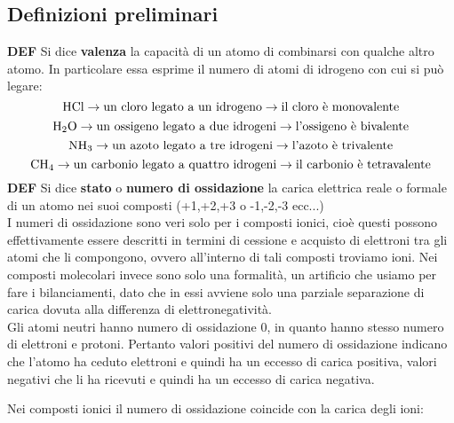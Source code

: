 \subsection{Definizioni preliminari}
\textbf{DEF} Si dice \textbf{valenza} la capacità di un atomo di combinarsi con qualche altro atomo. In particolare essa esprime il numero di atomi di idrogeno con cui si può legare:
$$\ce{HCl} \rightarrow \text{un cloro legato a un idrogeno} \rightarrow \text{il cloro è monovalente}$$
$$\ce{H_2O} \rightarrow \text{un ossigeno legato a due idrogeni} \rightarrow \text{l'ossigeno è bivalente}$$
$$\ce{NH_3} \rightarrow \text{un azoto legato a tre idrogeni} \rightarrow \text{l'azoto è trivalente}$$
$$\ce{CH_4} \rightarrow \text{un carbonio legato a quattro idrogeni} \rightarrow \text{il carbonio è tetravalente}$$
\textbf{DEF} Si dice \textbf{stato} o \textbf{numero di ossidazione} la carica elettrica reale o formale di un atomo nei suoi composti (+1,+2,+3 o -1,-2,-3 ecc...)\\

I numeri di ossidazione sono veri solo per i composti ionici, cioè questi possono effettivamente essere descritti in termini di cessione e acquisto di elettroni tra gli atomi che li compongono, ovvero all'interno di tali composti troviamo ioni. Nei composti molecolari invece sono solo una formalità, un artificio che usiamo per fare i bilanciamenti, dato che in essi avviene solo una parziale separazione di carica dovuta alla differenza di elettronegatività.\\

Gli atomi neutri hanno numero di ossidazione 0, in quanto hanno stesso numero di elettroni e protoni. Pertanto valori positivi del numero di ossidazione indicano che l'atomo ha ceduto elettroni e quindi ha un eccesso di carica positiva, valori negativi che li ha ricevuti e quindi ha un eccesso di carica negativa.


Nei composti ionici il numero di ossidazione coincide con la carica degli ioni:

